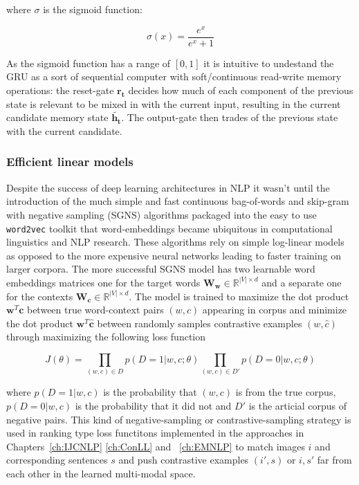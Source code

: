 where $\sigma$ is the sigmoid function:

\begin{equation}
\sigma(x) = \frac{e^x}{e^x + 1}
\end{equation}

As the sigmoid function has a range of $[0,1]$ it is intuitive to undestand the GRU as a sort of
sequential computer with soft/continuous read-write memory operations: the reset-gate $\mathbf{r_t}$
decides how much of each component of the previous state is relevant to be mixed in with the
current input, resulting in the current candidate memory state $\mathbf{\tilde{h_t}}$. The output-gate
then trades of the previous state with the current candidate.



\subsubsection{Efficient linear models}
\label{sec:w2v}
Despite the success of deep learning architectures in NLP it wasn't until the introduction 
of the much simple and fast continuous bag-of-words
and skip-gram with negative sampling (SGNS) algorithms \cite{mikolov2013efficient}
packaged into the easy to use \texttt{word2vec} toolkit that
word-embeddings became ubiquitous in computational linguistics and NLP research.
These algorithms rely on simple log-linear models as opposed to the more expensive
neural networks leading to faster training on larger corpora. The more successful SGNS
model has two learnable word embeddings matrices one for the target words
$\mathbf{W_w}  \in \mathbb{R}^{|V| \times d}$
and a separate one for the contexts $\mathbf{W_c} \in \mathbb{R}^{|V| \times d}$.
The model is trained to maximize the dot product $\mathbf{w}^T\mathbf{c}$
between true word-context pairs $(w,c)$ appearing in corpus and minimize the
dot product $\mathbf{w}^T\mathbf{\hat{c}}$ between randomly
samples contrastive examples $(w,\hat{c})$ through  maximizing the following loss function

\begin{equation}
J(\theta) = \prod_{(w,c) \in D} p(D=1|w,c;\theta)  \prod_{(w,c) \in D'}  p(D=0|w,c;\theta) 
\end{equation}

where  $p(D=1|w,c)$ is the probability that $(w,c)$ is from the true corpus, $p(D=0|w,c)$ is the
probability that it did not and $D'$ is the articial corpus of negative pairs.
This kind of negative-sampling or
contrastive-sampling strategy is used in ranking type loss functitons 
implemented in the approaches  in Chapters~\ref{ch:IJCNLP} \ref{ch:ConLL} and ~\ref{ch:EMNLP}
to match images $i$ and corresponding sentences $s$ and push contrastive examples $(i',s)$ 
or $i,s'$ far from each other in the learned multi-modal space.

